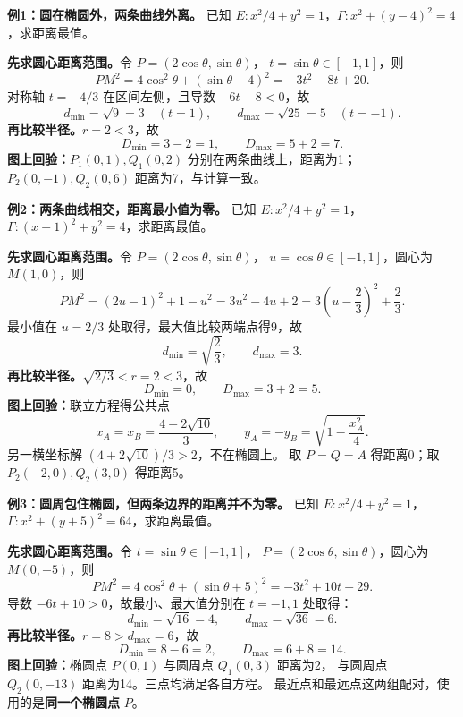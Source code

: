 \begin{examplebox}
\begin{minipage}{\linewidth}
\textbf{例1：圆在椭圆外，两条曲线外离。}
已知 $E:x^2/4+y^2=1$，$\Gamma:x^2+(y-4)^2=4$，求距离最值。

\end{minipage}
\textbf{先求圆心距离范围。}令 $P=(2\cos\theta,\sin\theta)$，
$t=\sin\theta\in[-1,1]$，则
\[
 PM^2=4\cos^2\theta+(\sin\theta-4)^2=-3t^2-8t+20.
\]
对称轴 $t=-4/3$ 在区间左侧，且导数 $-6t-8<0$，故
\[
 d_{\min}=\sqrt{9}=3\quad(t=1),\qquad
 d_{\max}=\sqrt{25}=5\quad(t=-1).
\]
\textbf{再比较半径。}$r=2<3$，故
\[
 \boxed{D_{\min}=3-2=1,\qquad D_{\max}=5+2=7.}
\]
\textbf{图上回验：}$P_1(0,1),Q_1(0,2)$ 分别在两条曲线上，距离为1；
$P_2(0,-1),Q_2(0,6)$ 距离为7，与计算一致。
\end{examplebox}

\begin{examplebox}
\begin{minipage}{\linewidth}
\textbf{例2：两条曲线相交，距离最小值为零。}
已知 $E:x^2/4+y^2=1$，$\Gamma:(x-1)^2+y^2=4$，求距离最值。

\end{minipage}
\textbf{先求圆心距离范围。}令 $P=(2\cos\theta,\sin\theta)$，
$u=\cos\theta\in[-1,1]$，圆心为 $M(1,0)$，则
\[
 PM^2=(2u-1)^2+1-u^2=3u^2-4u+2
 =3\left(u-\frac23\right)^2+\frac23.
\]
最小值在 $u=2/3$ 处取得，最大值比较两端点得9，故
\[
 d_{\min}=\sqrt{\frac23},\qquad d_{\max}=3.
\]
\textbf{再比较半径。}$\sqrt{2/3}<r=2<3$，故
\[
 \boxed{D_{\min}=0,\qquad D_{\max}=3+2=5.}
\]
\textbf{图上回验：}联立方程得公共点
\[
 x_A=x_B=\frac{4-2\sqrt{10}}3,\qquad
 y_A=-y_B=\sqrt{1-\frac{x_A^2}{4}}.
\]
另一横坐标解 $(4+2\sqrt{10})/3>2$，不在椭圆上。
取 $P=Q=A$ 得距离0；取 $P_2(-2,0),Q_2(3,0)$ 得距离5。
\end{examplebox}

\begin{examplebox}
\begin{minipage}{\linewidth}
\textbf{例3：圆周包住椭圆，但两条边界的距离并不为零。}
已知 $E:x^2/4+y^2=1$，$\Gamma:x^2+(y+5)^2=64$，求距离最值。

\end{minipage}
\textbf{先求圆心距离范围。}令 $t=\sin\theta\in[-1,1]$，
$P=(2\cos\theta,\sin\theta)$，圆心为 $M(0,-5)$，则
\[
 PM^2=4\cos^2\theta+(\sin\theta+5)^2=-3t^2+10t+29.
\]
导数 $-6t+10>0$，故最小、最大值分别在 $t=-1,1$ 处取得：
\[
 d_{\min}=\sqrt{16}=4,\qquad d_{\max}=\sqrt{36}=6.
\]
\textbf{再比较半径。}$r=8>d_{\max}=6$，故
\[
 \boxed{D_{\min}=8-6=2,\qquad D_{\max}=6+8=14.}
\]
\textbf{图上回验：}椭圆点 $P(0,1)$ 与圆周点 $Q_1(0,3)$ 距离为2，
与圆周点 $Q_2(0,-13)$ 距离为14。三点均满足各自方程。
最近点和最远点这两组配对，使用的是\textbf{同一个椭圆点} $P$。
\end{examplebox}
